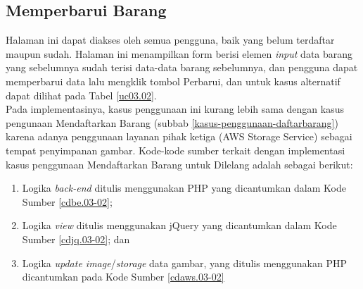 \subsection{Memperbarui Barang}
Halaman ini dapat diakses oleh semua pengguna, baik yang belum terdaftar maupun sudah. Halaman ini menampilkan form berisi elemen \textit{input} data barang yang sebelumnya sudah terisi data-data barang sebelumnya, dan pengguna dapat memperbarui data lalu mengklik tombol Perbarui, dan untuk kasus alternatif dapat dilihat pada Tabel \ref{uc03.02}.\\
\indent Pada implementasinya, kasus penggunaan ini kurang lebih sama dengan kasus pengunaan Mendaftarkan Barang (subbab \ref{kasus-penggunaan-daftarbarang}) karena adanya penggunaan layanan pihak ketiga (AWS Storage Service) sebagai tempat penyimpanan gambar. Kode-kode sumber terkait dengan implementasi kasus penggunaan Mendaftarkan Barang untuk Dilelang adalah sebagai berikut:
\begin{enumerate}
	\item Logika \textit{back-end} ditulis menggunakan PHP yang dicantumkan dalam Kode Sumber \ref{cdbe.03-02}; 
	\item Logika \textit{view} ditulis menggunakan jQuery yang dicantumkan dalam Kode Sumber \ref{cdjq.03-02}; dan
	\item Logika \textit{update image}/\textit{storage} data gambar, yang ditulis menggunakan PHP dicantumkan pada Kode Sumber \ref{cdaws.03-02}
\end{enumerate} 

